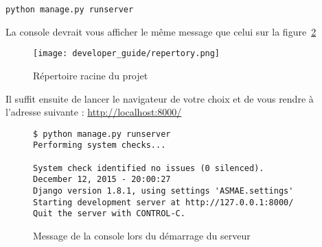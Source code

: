\verb#python manage.py runserver#
\bigskip

La console devrait vous afficher le même message que celui sur la
figure~\ref{fig:Message de la console lors du démarrage du serveur}

\begin{figure}[!ht]
    \centering
    \texttt{[image: developer\_guide/repertory.png]}
    \caption{Répertoire racine du projet}
    \label{fig:Répertoire racine du projet}
\end{figure}
\FloatBarrier

Il suffit ensuite de lancer le navigateur de votre choix et de vous rendre à
l’adresse suivante : \url{http://localhost:8000/}

\begin{figure}[!ht]
\begin{framed}
\begin{verbatim}
$ python manage.py runserver
Performing system checks...

System check identified no issues (0 silenced).
December 12, 2015 - 20:00:27
Django version 1.8.1, using settings 'ASMAE.settings'
Starting development server at http://127.0.0.1:8000/
Quit the server with CONTROL-C.
\end{verbatim}
\end{framed}
\caption{Message de la console lors du démarrage du serveur}
\label{fig:Message de la console lors du démarrage du serveur}
\end{figure}
\FloatBarrier
